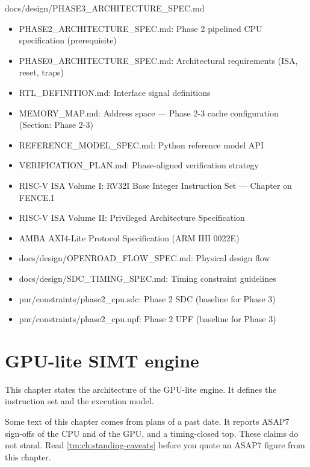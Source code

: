 \begin{relocated}{docs/design/PHASE3_ARCHITECTURE_SPEC.md}
\begin{itemize}
\tightlist
\item
  PHASE2\_\allowbreak{}ARCHITECTURE\_\allowbreak{}SPEC.md: Phase 2
  pipelined CPU specification (prerequisite)
\item
  PHASE0\_\allowbreak{}ARCHITECTURE\_\allowbreak{}SPEC.md: Architectural
  requirements (ISA, reset, traps)
\item
  RTL\_\allowbreak{}DEFINITION.md: Interface signal definitions
\item
  MEMORY\_\allowbreak{}MAP.md: Address space --- Phase 2-3 cache
  configuration (Section: Phase 2-3)
\item
  REFERENCE\_\allowbreak{}MODEL\_\allowbreak{}SPEC.md: Python reference
  model API
\item
  VERIFICATION\_\allowbreak{}PLAN.md: Phase-aligned verification
  strategy
\item
  RISC-V ISA Volume I: RV32I Base Integer Instruction Set --- Chapter on
  FENCE.I
\item
  RISC-V ISA Volume II: Privileged Architecture Specification
\item
  AMBA AXI4-Lite Protocol Specification (ARM IHI 0022E)
\item
  docs/\allowbreak{}design/\allowbreak{}OPENROAD\_\allowbreak{}FLOW\_\allowbreak{}SPEC.md:
  Physical design flow
\item
  docs/\allowbreak{}design/\allowbreak{}SDC\_\allowbreak{}TIMING\_\allowbreak{}SPEC.md:
  Timing constraint guidelines
\item
  pnr/\allowbreak{}constraints/\allowbreak{}phase2\_\allowbreak{}cpu.sdc:
  Phase 2 SDC (baseline for Phase 3)
\item
  pnr/\allowbreak{}constraints/\allowbreak{}phase2\_\allowbreak{}cpu.upf:
  Phase 2 UPF (baseline for Phase 3)
\end{itemize}
\end{relocated}

\chapter{GPU-lite SIMT engine}\label{ds:ch:gpu-lite-simt-engine}

This chapter states the architecture of the GPU-lite engine. It defines the instruction set and the execution model.

\begin{information}
Some text of this chapter comes from plans of a past date. It reports ASAP7 sign-offs of the CPU and of the GPU, and a timing-closed top. These claims do not stand. Read \cref{tm:ch:standing-caveats} before you quote an ASAP7 figure from this chapter.
\end{information}

